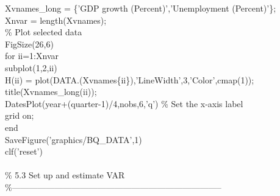 \hspace{1mm}Xvnames\_long = \{\textcolor{matlabpurple}{'GDP growth (Percent)'},\textcolor{matlabpurple}{'Unemployment (Percent)'}\}; \\ 
\hspace{1mm}Xnvar        = length(Xvnames); \\ 
\hspace{1mm}\textcolor{matlabgreen}{\% Plot selected data }\\ 
\hspace{1mm}FigSize(26,6) \\ 
\hspace{1mm}\textcolor{matlabblue}{for} ii=1:Xnvar \\ 
\hspace{1mm}\hspace{5mm} subplot(1,2,ii) \\ 
\hspace{1mm}\hspace{5mm} H(ii) = plot(DATA.(Xvnames\{ii\}),\textcolor{matlabpurple}{'LineWidth'},3,\textcolor{matlabpurple}{'Color'},cmap(1)); \\ 
\hspace{1mm}\hspace{5mm} title(Xvnames\_long(ii));  \\ 
\hspace{1mm}\hspace{5mm} DatesPlot(year+(quarter-1)/4,nobs,6,\textcolor{matlabpurple}{'q'}) \textcolor{matlabgreen}{\% Set the x-axis label  }\\ 
\hspace{1mm}\hspace{5mm} grid on;  \\ 
\hspace{1mm}\textcolor{matlabblue}{end} \\ 
\hspace{1mm}SaveFigure(\textcolor{matlabpurple}{'graphics/BQ\_DATA'},1) \\ 
\hspace{1mm}clf(\textcolor{matlabpurple}{'reset'}) \\ 
\hspace{1mm} \\ 
\hspace{1mm}\textcolor{matlabgreen}{\% 5.3 Set up and estimate VAR }\\ 
\hspace{1mm}\textcolor{matlabgreen}{\%--------------------------------------------------------------------------  }\\ 
